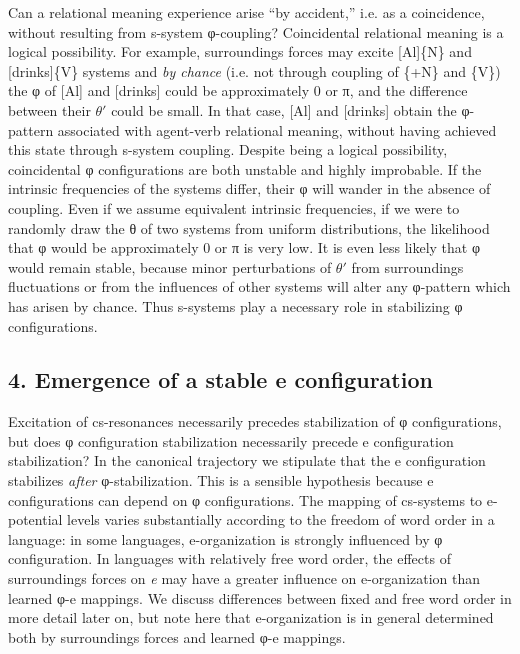   Can a relational meaning experience arise “by accident,” i.e. as a coincidence, without resulting from s-system φ-coupling? Coincidental relational meaning is a logical possibility. For example, surroundings forces may excite [Al]\{N\} and [drinks]\{V\} systems and \textit{by chance} (i.e. not through coupling of \{+N\} and \{V\}) the φ of [Al] and [drinks] could be approximately 0 or π, and the difference between their $\theta ′$ could be small. In that case, [Al] and [drinks] obtain the φ-pattern associated with agent-verb relational meaning, without having achieved this state through s-system coupling. Despite being a logical possibility, coincidental φ configurations are both unstable and highly improbable. If the intrinsic frequencies of the systems differ, their φ will wander in the absence of coupling. Even if we assume equivalent intrinsic frequencies, if we were to randomly draw the θ of two systems from uniform distributions, the likelihood that φ would be approximately 0 or π is very low. It is even less likely that φ would remain stable, because minor perturbations of $\theta ′$ from surroundings fluctuations or from the influences of other systems will alter any φ-pattern which has arisen by chance. Thus s-systems play a necessary role in stabilizing φ configurations.

\subsection{4. Emergence of a stable e configuration}

Excitation of cs-resonances necessarily precedes stabilization of φ configurations, but does φ configuration stabilization necessarily precede e configuration stabilization? In the canonical trajectory we stipulate that the e configuration stabilizes \textit{after} φ-stabilization. This is a sensible hypothesis because e configurations can depend on φ configurations. The mapping of cs-systems to e-potential levels varies substantially according to the freedom of word order in a language: in some languages, e-organization is strongly influenced by φ configuration. In languages with relatively free word order, the effects of surroundings forces on \textit{e} may have a greater influence on e-organization than learned φ-e mappings. We discuss differences between fixed and  free word order in more detail later on, but note here that e-organization is in general determined both by surroundings forces and learned φ-e mappings.

